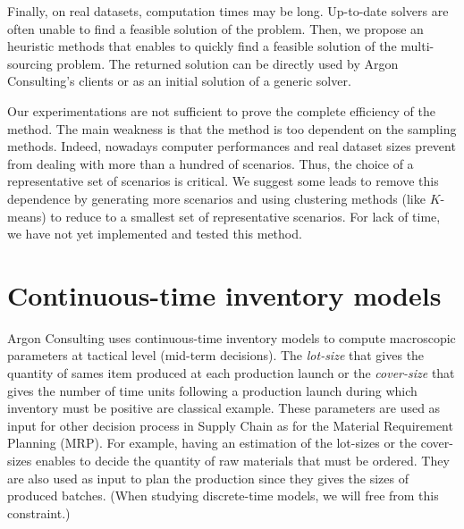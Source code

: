 \medskip


Finally, on real datasets, computation times may be long.
Up-to-date solvers are often unable to find a feasible solution of the problem.
Then, we propose an heuristic methods that enables to quickly find a feasible solution of the multi-sourcing problem.
The returned solution can be directly used by Argon Consulting's clients or as an initial solution of a generic solver.


\medskip


Our experimentations are not sufficient to prove the complete efficiency of the method.
The main weakness is that the method is too dependent on the sampling methods.
Indeed, nowadays computer performances and real dataset sizes prevent from dealing with more than a hundred of scenarios.
Thus, the choice of a representative set of scenarios is critical.
We suggest some leads to remove this dependence by generating more scenarios and using clustering methods (like $K$-means) to reduce to a smallest set of representative scenarios.
For lack of time, we have not yet implemented and tested this method.



\section{Continuous-time inventory models}
\label{sec:intro:en:continuous-time-inventory-models}


Argon Consulting uses continuous-time inventory models to compute macroscopic parameters at tactical level (mid-term decisions).
The \emph{lot-size} that gives the quantity of sames item produced at each production launch or the \emph{cover-size} that gives the number of time units following a production launch during which inventory must be positive are classical example.
These parameters are used as input for other decision process in Supply Chain as for the Material Requirement Planning (MRP).
For example, having an estimation of the lot-sizes or the cover-sizes enables to decide the quantity of raw materials that must be ordered.
They are also used as input to plan the production since they gives the sizes of produced batches.
(When studying discrete-time models, we will free from this constraint.)


